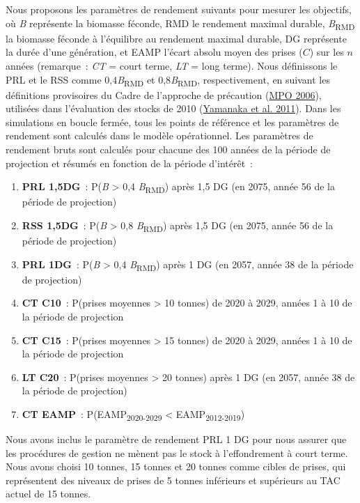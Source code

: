 \documentclass[french,11pt]{book}
\begin{document}
Nous proposons les paramètres de rendement suivants pour mesurer les objectifs, où \emph{B} représente la biomasse féconde, RMD le rendement maximal durable, \emph{B}\textsubscript{RMD} la biomasse féconde à l'équilibre au rendement maximal durable, DG représente la durée d'une génération, et EAMP l'écart absolu moyen des prises (\(C\)) sur les \(n\) années (remarque~: \emph{CT} = court terme, \emph{LT} = long terme). Nous définissons le PRL et le RSS comme 0,4\emph{B}\textsubscript{RMD} et 0,8\emph{B}\textsubscript{RMD}, respectivement, en suivant les définitions provisoires du Cadre de l'approche de précaution (\protect\hyperlink{ref-dfo2006}{MPO 2006}), utilisées dans l'évaluation des stocks de 2010 (\protect\hyperlink{ref-yamanaka2011}{Yamanaka et al. 2011}). Dans les simulations en boucle fermée, tous les points de référence et les paramètres de rendement sont calculés dans le modèle opérationnel. Les paramètres de rendement bruts sont calculés pour chacune des 100 années de la période de projection et résumés en fonction de la période d'intérêt~:
\begin{enumerate}
\def\labelenumi{\arabic{enumi}.}

\item
  \textbf{PRL 1,5DG}~: P(\emph{B} \textgreater{} 0,4 \emph{B}\textsubscript{RMD}) après 1,5 DG (en 2075, année 56 de la période de projection)
\item
  \textbf{RSS 1,5DG}~: P(\emph{B} \textgreater{} 0,8 \emph{B}\textsubscript{RMD}) après 1,5 DG (en 2075, année 56 de la période de projection)
\item
  \textbf{PRL 1DG}~: P(\emph{B} \textgreater{} 0,4 \emph{B}\textsubscript{RMD}) après 1 DG (en 2057, année 38 de la période de projection)
\item
  \textbf{CT C10}~: P(prises moyennes \textgreater{} 10 tonnes) de 2020 à 2029, années 1 à 10 de la période de projection
\item
  \textbf{CT C15}~: P(prises moyennes \textgreater{} 15 tonnes) de 2020 à 2029, années 1 à 10 de la période de projection
\item
  \textbf{LT C20}~: P(prises moyennes \textgreater{} 20 tonnes) après 1 DG (en 2057, année 38 de la période de projection)
\item
  \textbf{CT EAMP}~: P(EAMP\textsubscript{2020-2029} \textless{} EAMP\textsubscript{2012-2019})
\end{enumerate}
Nous avons inclus le paramètre de rendement PRL 1 DG pour nous assurer que les procédures de gestion ne mènent pas le stock à l'effondrement à court terme. Nous avons choisi 10 tonnes, 15 tonnes et 20 tonnes comme cibles de prises, qui représentent des niveaux de prises de 5 tonnes inférieurs et supérieurs au TAC actuel de 15 tonnes.
\end{document}
